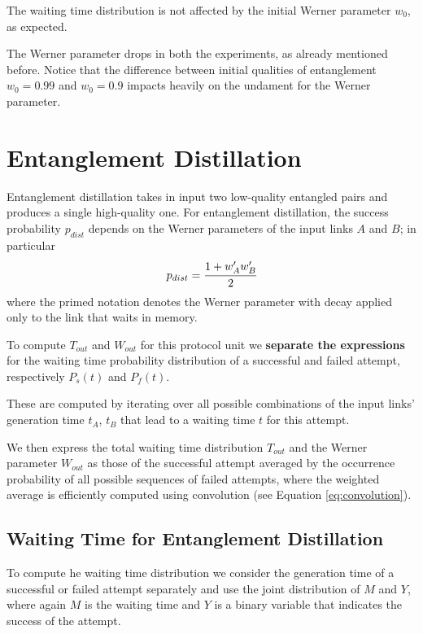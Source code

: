 \documentclass{masterthesis}
\begin{document}
The waiting time distribution is not affected by the initial Werner parameter $w_0$, as expected.

The Werner parameter drops in both the experiments, as already mentioned before.
Notice that the difference between initial qualities of entanglement $w_0 = 0.99$ and $w_0 = 0.9$ impacts heavily on the undament for the Werner parameter.

\newpage
\section*{Entanglement Distillation}

Entanglement distillation takes in input two low-quality entangled pairs and produces a single high-quality one.
For entanglement distillation, the success probability $p_{dist}$ depends on the Werner parameters of the input links $A$ and $B$; in particular
\begin{equation}
    p_{dist} = \cfrac{1+w_A'w_B'}{2}
\end{equation}
where the primed notation denotes the Werner parameter with decay applied only to the link that waits in memory.

To compute $T_{out}$ and $W_{out}$ for this protocol unit we \textbf{separate the expressions} for the waiting time probability distribution of a successful and failed attempt, respectively $P_s(t)$ and $P_f(t)$.

These are computed by iterating over all possible combinations of the input links' generation time $t_A$, $t_B$ that lead to a waiting time $t$ for this attempt.

We then express the total waiting time distribution $T_{out}$ and the Werner parameter $W_{out}$ as those of the successful attempt averaged by the occurrence probability of all possible sequences of failed attempts, where the weighted average is efficiently computed using convolution (see Equation \ref{eq:convolution}). %

\subsection*{Waiting Time for Entanglement Distillation}

To compute he waiting time distribution we consider the generation time of a successful or failed attempt separately and use the joint distribution of $M$ and $Y$, where again $M$ is the waiting time and $Y$ is a binary variable that indicates the success of the attempt. %
\end{document}
